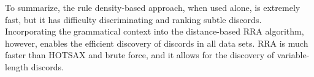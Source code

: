 \documentclass{sig-alternate}
\begin{document}
To summarize, the rule density-based approach, when used alone, is extremely fast, but it has difficulty discriminating and ranking subtle discords. Incorporating the grammatical context into the distance-based RRA algorithm, however, enables the efficient discovery of discords in all data sets. RRA is much faster than HOTSAX and brute force, and it allows for the discovery of variable-length discords. 


\end{document}
